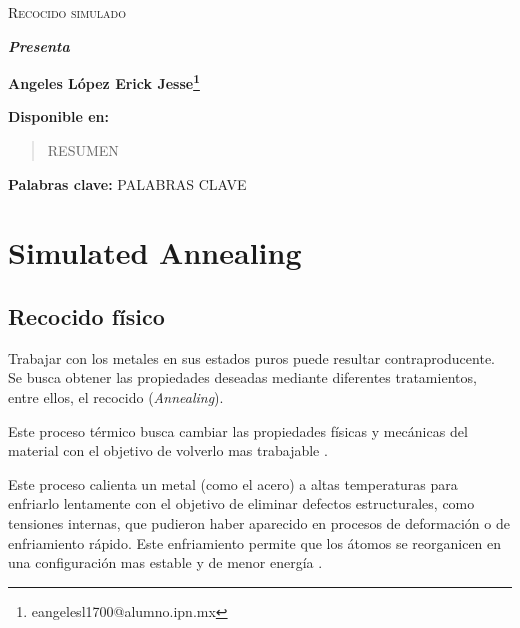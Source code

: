 \documentclass[12pt,twoside]{article}
\newcommand{\keywords}[1]{%
	\begin{center}
		\textbf{Palabras clave:} #1
	\end{center}
}
\begin{document}
	\centerline{}
	
	
	
	\begin{center}
		\Large{\textsc{Recocido simulado}} 
	\end{center}
	\centerline{}
	\centerline{\bf {\textit{Presenta}}}
	\centerline{}
	\centerline{\bf {Angeles López Erick Jesse\footnote{eangelesl1700@alumno.ipn.mx}}}
	\centerline{}
	\centerline{}
	\centerline{\bf {Disponible en:}}
	\centerline{}
	
	
	
	\newtheorem{Theorem}{\quad Theorem}[section]
	
	\newtheorem{Definition}[Theorem]{\quad Definition}
	
	\newtheorem{Corollary}[Theorem]{\quad Corollary}
	
	\newtheorem{Lemma}[Theorem]{\quad Lemma}
	
	\newtheorem{Example}[Theorem]{\quad Example}
	
	\bigskip
	
	\bigskip
	
	\begin{abstract} 
		RESUMEN
	\end{abstract}
	
	\keywords{PALABRAS CLAVE}
	
	\clearpage
	
	\tableofcontents
	\clearpage
		
	\section{Simulated Annealing}

	\subsection{Recocido físico}

	Trabajar con los metales en sus estados puros puede resultar contraproducente. Se busca obtener las propiedades deseadas mediante diferentes tratamientos, entre ellos, el recocido (\textit{Annealing}).
	
	Este proceso térmico busca cambiar las propiedades físicas y mecánicas del material con el objetivo de volverlo mas trabajable \cite{recocido}.

	Este proceso calienta un metal (como el acero) a altas temperaturas para enfriarlo lentamente con el objetivo de eliminar defectos estructurales, como tensiones internas, que pudieron haber aparecido en procesos de deformación o de enfriamiento rápido. Este enfriamiento permite que los átomos se reorganicen en una configuración mas estable y de menor energía \cite{recocido_2}.
	
\end{document}
